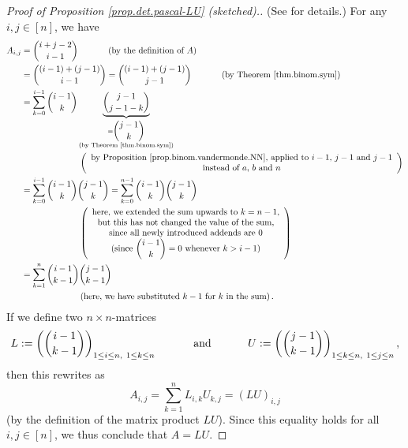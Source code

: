 \begin{proof}
[Proof of Proposition \ref{prop.det.pascal-LU} (sketched).](See \cite[Exercise
6.11]{detnotes} for details.) For any $i,j\in\left[  n\right]  $, we have%
\begin{align*}
A_{i,j}  &  =\dbinom{i+j-2}{i-1}\ \ \ \ \ \ \ \ \ \ \left(  \text{by the
definition of }A\right) \\
&  =\dbinom{\left(  i-1\right)  +\left(  j-1\right)  }{i-1}=\dbinom{\left(
i-1\right)  +\left(  j-1\right)  }{j-1}\ \ \ \ \ \ \ \ \ \ \left(  \text{by
Theorem \ref{thm.binom.sym}}\right) \\
&  =\sum_{k=0}^{i-1}\dbinom{i-1}{k}\underbrace{\dbinom{j-1}{j-1-k}%
}_{\substack{=\dbinom{j-1}{k}\\\text{(by Theorem \ref{thm.binom.sym})}}}\\
&  \ \ \ \ \ \ \ \ \ \ \ \ \ \ \ \ \ \ \ \ \left(
\begin{array}
[c]{c}%
\text{by Proposition \ref{prop.binom.vandermonde.NN}, applied to }i-1\text{,
}j-1\text{ and }j-1\\
\text{instead of }a\text{, }b\text{ and }n
\end{array}
\right) \\
&  =\sum_{k=0}^{i-1}\dbinom{i-1}{k}\dbinom{j-1}{k}=\sum_{k=0}^{n-1}%
\dbinom{i-1}{k}\dbinom{j-1}{k}\\
&  \ \ \ \ \ \ \ \ \ \ \ \ \ \ \ \ \ \ \ \ \left(
\begin{array}
[c]{c}%
\text{here, we extended the sum upwards to }k=n-1\text{,}\\
\text{but this has not changed the value of the sum,}\\
\text{since all newly introduced addends are }0\\
\text{(since }\dbinom{i-1}{k}=0\text{ whenever }k>i-1\text{)}%
\end{array}
\right) \\
&  =\sum_{k=1}^{n}\dbinom{i-1}{k-1}\dbinom{j-1}{k-1}\\
&  \ \ \ \ \ \ \ \ \ \ \ \ \ \ \ \ \ \ \ \ \left(  \text{here, we have
substituted }k-1\text{ for }k\text{ in the sum}\right)  .
\end{align*}
If we define two $n\times n$-matrices%
\[
L:=\left(  \dbinom{i-1}{k-1}\right)  _{1\leq i\leq n,\ 1\leq k\leq
n}\ \ \ \ \ \ \ \ \ \ \text{and}\ \ \ \ \ \ \ \ \ \ U:=\left(  \dbinom
{j-1}{k-1}\right)  _{1\leq k\leq n,\ 1\leq j\leq n},
\]
then this rewrites as%
\[
A_{i,j}=\sum_{k=1}^{n}L_{i,k}U_{k,j}=\left(  LU\right)  _{i,j}%
\]
(by the definition of the matrix product $LU$). Since this equality holds for
all $i,j\in\left[  n\right]  $, we thus conclude that $A=LU$.


\end{proof}
